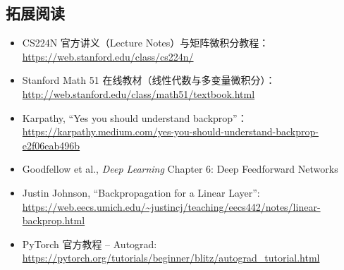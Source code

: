 \subsection{拓展阅读}

\begin{itemize}
    \item CS224N 官方讲义（Lecture Notes）与矩阵微积分教程：\url{https://web.stanford.edu/class/cs224n/}
    \item Stanford Math 51 在线教材（线性代数与多变量微积分）：\url{http://web.stanford.edu/class/math51/textbook.html}
    \item Karpathy, ``Yes you should understand backprop''：\url{https://karpathy.medium.com/yes-you-should-understand-backprop-e2f06eab496b}
    \item Goodfellow et al., \textit{Deep Learning} Chapter 6: Deep Feedforward Networks
    \item Justin Johnson, ``Backpropagation for a Linear Layer'': \url{https://web.eecs.umich.edu/~justincj/teaching/eecs442/notes/linear-backprop.html}
    \item PyTorch 官方教程 -- Autograd: \url{https://pytorch.org/tutorials/beginner/blitz/autograd_tutorial.html}
\end{itemize}


